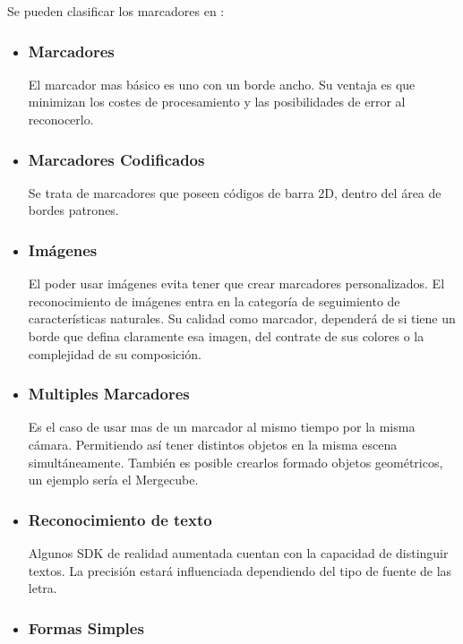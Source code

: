 	Se pueden clasificar los marcadores en \cite{linowes_babilinski_2017}:
	\begin{itemize}
		\item \subsubsection{Marcadores}El marcador mas básico es uno con un borde ancho. Su ventaja es que minimizan los costes de procesamiento y las posibilidades de error al reconocerlo.
		\item \subsubsection{Marcadores Codificados}Se trata de marcadores que poseen códigos de barra 2D, dentro del área de bordes patrones. 
		\item \subsubsection{Imágenes}El poder usar imágenes evita tener que crear marcadores personalizados. El reconocimiento de imágenes entra en la categoría de seguimiento de características naturales. Su calidad como marcador, dependerá de si tiene un borde que defina claramente esa imagen, del contrate de sus colores o la complejidad de su composición.
		\item \subsubsection{Multiples Marcadores}
		Es el caso de usar mas de un marcador al mismo tiempo por la misma cámara. Permitiendo así tener distintos objetos en la misma escena simultáneamente. También es posible crearlos formado objetos geométricos, un ejemplo sería el Mergecube.
		\item \subsubsection{Reconocimiento de texto}
		Algunos SDK de realidad aumentada cuentan con la capacidad de distinguir textos. La precisión estará influenciada dependiendo del tipo de fuente de las letra. 
		\item \subsubsection{Formas Simples}

\end{itemize}
